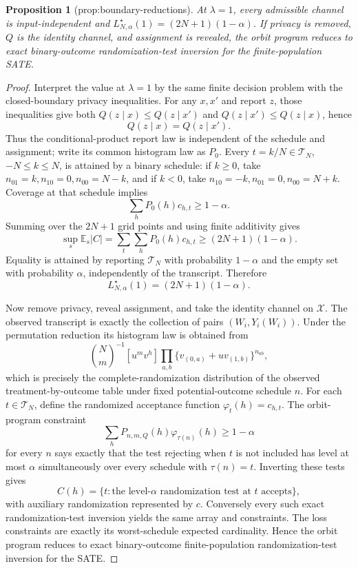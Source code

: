 \documentclass{article}
\newtheorem{proposition}{Proposition}
\begin{document}
\begin{proposition}[prop:boundary-reductions]\label{prop:boundary-reductions}
At \(\lambda=1\), every admissible channel is input-independent and \(L^\star_{N,\alpha}(1)=(2N+1)(1-\alpha)\). If privacy is removed, \(Q\) is the identity channel, and assignment is revealed, the orbit program reduces to exact binary-outcome randomization-test inversion for the finite-population SATE.
\end{proposition}
\begin{proof}
Interpret the value at \(\lambda=1\) by the same finite decision problem with the closed-boundary privacy inequalities.  For any \(x,x'\) and report \(z\), those inequalities give both \(Q(z\mid x)\le Q(z\mid x')\) and \(Q(z\mid x')\le Q(z\mid x)\), hence
\[
 Q(z\mid x)=Q(z\mid x').
\]
Thus the conditional-product report law is independent of the schedule and assignment; write its common histogram law as \(P_0\).  Every \(t=k/N\in\mathcal T_N\), \(-N\le k\le N\), is attained by a binary schedule: if \(k\ge0\), take \(n_{01}=k,n_{10}=0,n_{00}=N-k\), and if \(k<0\), take \(n_{10}=-k,n_{01}=0,n_{00}=N+k\).  Coverage at that schedule implies
\[
 \sum_hP_0(h)c_{h,t}\ge1-\alpha.
\]
Summing over the \(2N+1\) grid points and using finite additivity gives
\[
 \sup_s\mathbb E_s|C|
 =\sum_t\sum_hP_0(h)c_{h,t}
 \ge(2N+1)(1-\alpha).
\]
Equality is attained by reporting \(\mathcal T_N\) with probability \(1-\alpha\) and the empty set with probability \(\alpha\), independently of the transcript.  Therefore
\[
 L^\star_{N,\alpha}(1)=(2N+1)(1-\alpha).
\]

Now remove privacy, reveal assignment, and take the identity channel on \(\mathcal X\).  The observed transcript is exactly the collection of pairs \((W_i,Y_i(W_i))\).  Under the permutation reduction its histogram law is obtained from
\[
 \binom Nm^{-1}[u^mv^h]
 \prod_{a,b}\{v_{(0,a)}+uv_{(1,b)}\}^{n_{ab}},
\]
which is precisely the complete-randomization distribution of the observed treatment-by-outcome table under fixed potential-outcome schedule \(n\).  For each \(t\in\mathcal T_N\), define the randomized acceptance function \(\varphi_t(h)=c_{h,t}\).  The orbit-program constraint
\[
 \sum_hP_{n,m,Q}(h)\varphi_{\tau(n)}(h)\ge1-\alpha
\]
for every \(n\) says exactly that the test rejecting when \(t\) is not included has level at most \(\alpha\) simultaneously over every schedule with \(\tau(n)=t\).  Inverting these tests gives
\[
 C(h)=\{t:\text{the level-}\alpha\text{ randomization test at }t\text{ accepts}\},
\]
with auxiliary randomization represented by \(c\).  Conversely every such exact randomization-test inversion yields the same array and constraints.  The loss constraints are exactly its worst-schedule expected cardinality.  Hence the orbit program reduces to exact binary-outcome finite-population randomization-test inversion for the SATE.
\end{proof}
\end{document}
